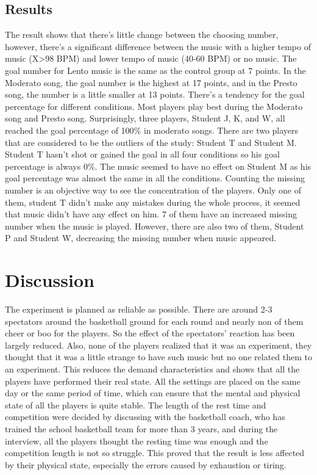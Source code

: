 \documentclass{article}
\begin{document}
\subsection{Results}

The result shows that there's little change between the choosing number, however, there's a significant difference between the music with a higher tempo of music (X>98 BPM) and lower tempo of music (40-60 BPM) or no music. The goal number for Lento music is the same as the control group at 7 points. In the Moderato song, the goal number is the highest at 17 points, and in the Presto song, the number is a little smaller at 13 points. 
There's a tendency for the goal percentage for different conditions. Most players play best during the Moderato song and Presto song. Surprisingly, three players, Student J, K, and W, all reached the goal percentage of 100\% in moderato songs. There are two players that are considered to be the outliers of the study: Student T and Student M. Student T hasn't shot or gained the goal in all four conditions so his goal percentage is always 0\%. The music seemed to have no effect on Student M as his goal percentage was almost the same in all the conditions.
Counting the missing number is an objective way to see the concentration of the players. Only one of them, student T didn't make any mistakes during the whole process, it seemed that music didn't have any effect on him. 7 of them have an increased missing number when the music is played. However, there are also two of them, Student P and Student W, decreasing the missing number when music appeared. 

\section{Discussion}

The experiment is planned as reliable as possible. There are around 2-3 spectators around the basketball ground for each round and nearly non of them cheer or boo for the players. So the effect of the spectators' reaction has been largely reduced. Also, none of the players realized that it was an experiment, they thought that it was a little strange to have such music but no one related them to an experiment. This reduces the demand characteristics and shows that all the players have performed their real state. All the settings are placed on the same day or the same period of time, which can ensure that the mental and physical state of all the players is quite stable. The length of the rest time and competition were decided by discussing with the basketball coach, who has trained the school basketball team for more than 3 years, and during the interview, all the players thought the resting time was enough and the competition length is not so struggle. This proved that the result is less affected by their physical state, especially the errors caused by exhaustion or tiring. 
\end{document}
